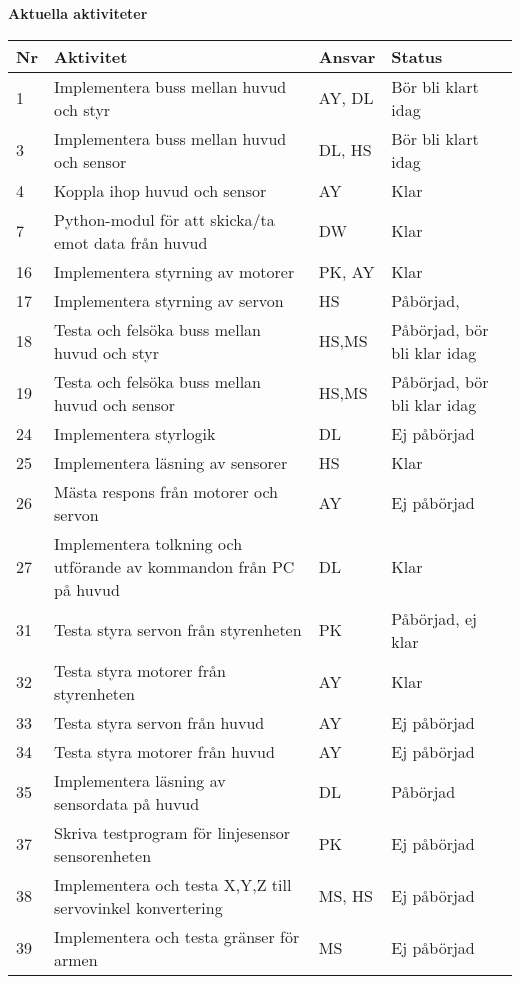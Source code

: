 \documentclass[titlepage, a4paper]{article}
\begin{document}
\newpage
\textbf{\Large Aktuella aktiviteter}
\begin{center}
\begin{tabularx}{\textwidth}{| p{4mm} | X | p{13.5mm} | X |}
	\hline
	\textbf{Nr} & \textbf{Aktivitet} & \textbf{Ansvar} & \textbf{Status} \\\hline
	{1} & {Implementera buss mellan huvud och styr} & {AY, DL} & {Bör bli klart idag} \\\hline
	{3} & {Implementera buss mellan huvud och sensor} & {DL, HS} & {Bör bli klart idag} \\\hline
	{4} & {Koppla ihop huvud och sensor} & {AY} & {Klar} \\\hline
	{7} & {Python-modul för att skicka/ta emot data från huvud} & {DW} & {Klar} \\\hline
	{16} & {Implementera styrning av motorer} & {PK, AY} & {Klar} \\\hline
	{17} & {Implementera styrning av servon} & {HS} & {Påbörjad, } \\\hline
	{18} & {Testa och felsöka buss mellan huvud och styr} & {HS,MS} & {Påbörjad, bör bli klar idag} \\\hline
	{19} & {Testa och felsöka buss mellan huvud och sensor} & {HS,MS} & {Påbörjad, bör bli klar idag} \\\hline
	{24} & {Implementera styrlogik} & {DL} & {Ej påbörjad} \\\hline
	{25} & {Implementera läsning av sensorer} & {HS} & {Klar} \\\hline
	{26} & {Mästa respons från motorer och servon} & {AY} & {Ej påbörjad} \\\hline
	{27} & {Implementera tolkning och utförande av kommandon från PC på huvud} & {DL} & {Klar} \\\hline
	{31} & {Testa styra servon från styrenheten} & {PK} & {Påbörjad, ej klar} \\\hline
	{32} & {Testa styra motorer från styrenheten} & {AY} & {Klar} \\\hline
	{33} & {Testa styra servon från huvud} & {AY} & {Ej påbörjad} \\\hline
	{34} & {Testa styra motorer från huvud} & {AY} & {Ej påbörjad} \\\hline
	{35} & {Implementera läsning av sensordata på huvud} & {DL} & {Påbörjad} \\\hline
	{37} & {Skriva testprogram för linjesensor sensorenheten} & {PK} & {Ej påbörjad} \\\hline
	{38} & {Implementera och testa X,Y,Z  till servovinkel konvertering} & {MS, HS} & {Ej påbörjad} \\\hline
	{39} & {Implementera och testa gränser för armen} & {MS} & {Ej påbörjad} \\\hline
\end{tabularx}
\end{center}
\end{document}
